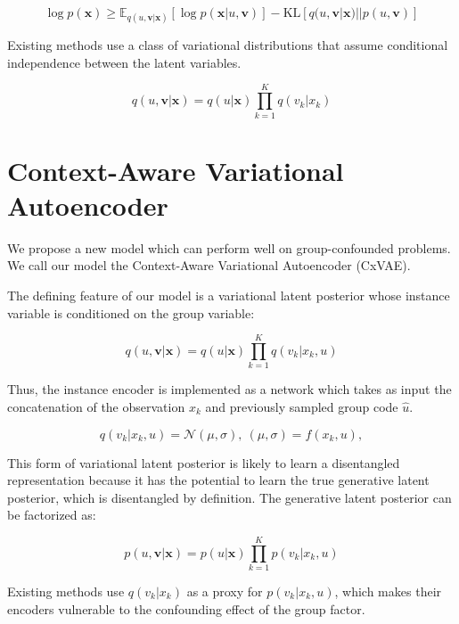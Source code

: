 \documentclass[nohyperref]{article}
\theoremstyle{plain}
\theoremstyle{definition}
\theoremstyle{remark}
\begin{document}
\begin{equation}
\log p(\mathbf{x}) \geq \mathbb{E}_{q(u, \mathbf{v} | \mathbf{x})} [\log p(\mathbf{x} | u, \mathbf{v})] - \mathrm{KL} [q(u, \mathbf{v} | \mathbf{x}) || p(u, \mathbf{v})]
\end{equation}

Existing methods use a class of variational distributions that assume conditional independence between the latent variables.

\begin{equation}
q(u, \mathbf{v} | \mathbf{x}) = q(u | \mathbf{x}) \prod_{k=1}^K q(v_k | x_k)
\end{equation}

\section{Context-Aware Variational Autoencoder}

We propose a new model which can perform well on group-confounded problems. We call our model the Context-Aware Variational Autoencoder (CxVAE). 

The defining feature of our model is a variational latent posterior whose instance variable is conditioned on the group variable:

\begin{equation}
q(u, \mathbf{v} | \mathbf{x}) = q(u | \mathbf{x}) \prod_{k=1}^K q(v_k | x_k, u)
\end{equation}

Thus, the instance encoder is implemented as a network which takes as input the concatenation of the observation $x_k$ and previously sampled group code $\hat{u}$.

\begin{equation}
q(v_k | x_k, u) = \mathcal{N} (\mu, \sigma), ~ (\mu, \sigma) = f (x_k, u),
\end{equation}

This form of variational latent posterior is likely to learn a disentangled representation because it has the potential to learn the true generative latent posterior, which is disentangled by definition. The generative latent posterior can be factorized as:

\begin{equation}
p(u, \mathbf{v} | \mathbf{x}) = p(u | \mathbf{x}) \prod_{k=1}^K p(v_k | x_k, u)
\end{equation}

Existing methods use $q(v_k | x_k)$ as a proxy for $p(v_k | x_k, u)$, which makes their encoders vulnerable to the confounding effect of the group factor.
\end{document}

